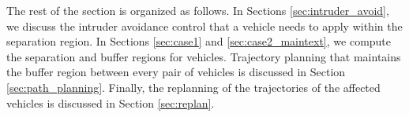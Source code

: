 The rest of the section is organized as follows. In Sections \ref{sec:intruder_avoid}, we discuss the intruder avoidance control that a vehicle needs to apply within the separation region. In Sections \ref{sec:case1} and \ref{sec:case2_maintext}, we compute the separation and buffer regions for vehicles. 
Trajectory planning that maintains the buffer region between every pair of vehicles is discussed in Section \ref{sec:path_planning}. Finally, the replanning of the trajectories of the affected vehicles is discussed in Section \ref{sec:replan}. 
